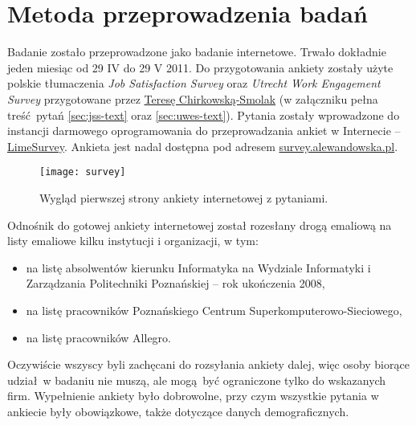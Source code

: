 \chapter{Metoda przeprowadzenia badań}
Badanie zostało przeprowadzone jako badanie internetowe. Trwało dokładnie jeden miesiąc od 29 IV do 29 V 2011. Do przygotowania ankiety zostały użyte polskie tłumaczenia \emph{Job Satisfaction Survey} oraz \emph{Utrecht Work Engagement Survey} przygotowane przez \href{http://www.psychologia.amu.edu.pl/ip-uam/struktura-zatrudnienia-w-instytucie/curriculum-vitae-teresa-chirkowska-smolak/}{Teresę Chirkowską-Smolak} (w załączniku pełna treść pytań \ref{sec:jss-text} oraz \ref{sec:uwes-text}). Pytania zostały wprowadzone do instancji darmowego oprogramowania do przeprowadzania ankiet
w Internecie -- \href{http://www.limesurvey.org/}{LimeSurvey}. Ankieta jest nadal dostępna pod
adresem \url{survey.alewandowska.pl}.

\begin{figure}[h]
\begin{center}
\texttt{[image: survey]}
\end{center}
\caption{Wygląd pierwszej strony ankiety internetowej z pytaniami.}
\label{fig:sex}
\end{figure}

Odnośnik do gotowej ankiety internetowej został rozesłany drogą emaliową na listy emaliowe kilku instytucji i organizacji, w tym:
\begin{itemize}
\item na listę absolwentów kierunku Informatyka na Wydziale Informatyki i Zarządzania Politechniki Poznańskiej -- rok ukończenia 2008,
\item na listę pracowników Poznańskiego Centrum Superkomputerowo-Sieciowego,
\item na listę pracowników Allegro.
\end{itemize}
Oczywiście wszyscy byli zachęcani do rozsyłania ankiety dalej, więc osoby biorące udział w badaniu nie muszą, ale mogą być ograniczone tylko do wskazanych firm. Wypełnienie ankiety było dobrowolne, przy czym wszystkie pytania w ankiecie były obowiązkowe, także dotyczące danych demograficznych.
